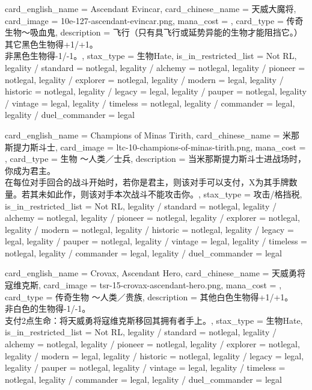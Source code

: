 \documentclass[lang = cn, color = black, 10pt]{AllThatStax}
\begin{document}
\card
{
	card_english_name = {Ascendant Evincar},
	card_chinese_name = {天威大魔将},
	card_image = 10e-127-ascendant-evincar.png,
	mana_cost = ,
	card_type = 传奇生物～吸血鬼,
	description = {飞行（只有具飞行或延势异能的生物才能阻挡它。）\\
		其它黑色生物得+1/+1。\\
		非黑色生物得-1/-1。},
	stax_type = 生物Hate,
	is_in_restricted_list = Not RL,
	legality / standard = notlegal,
	legality / alchemy = notlegal,
	legality / pioneer = notlegal,
	legality / explorer = notlegal,
	legality / modern = legal,
	legality / historic = notlegal,
	legality / legacy = legal,
	legality / pauper = notlegal,
	legality / vintage = legal,
	legality / timeless = notlegal,
	legality / commander = legal,
	legality / duel_commander = legal
}

\card
{
	card_english_name = {Champions of Minas Tirith},
	card_chinese_name = {米那斯提力斯斗士},
	card_image = ltc-10-champions-of-minas-tirith.png,
	mana_cost = ,
	card_type = 生物 ～人类／士兵,
	description = {当米那斯提力斯斗士进战场时，你成为君主。\\
		在每位对手回合的战斗开始时，若你是君主，则该对手可以支付，X为其手牌数量。若其未如此作，则该对手本次战斗不能攻击你。},
	stax_type = 攻击/格挡税,
	is_in_restricted_list = Not RL,
	legality / standard = notlegal,
	legality / alchemy = notlegal,
	legality / pioneer = notlegal,
	legality / explorer = notlegal,
	legality / modern = notlegal,
	legality / historic = notlegal,
	legality / legacy = legal,
	legality / pauper = notlegal,
	legality / vintage = legal,
	legality / timeless = notlegal,
	legality / commander = legal,
	legality / duel_commander = legal
}

\card
{
	card_english_name = {Crovax, Ascendant Hero},
	card_chinese_name = {天威勇将寇维克斯},
	card_image = tsr-15-crovax-ascendant-hero.png,
	mana_cost = ,
	card_type = 传奇生物 ～人类／贵族,
	description = {其他白色生物得+1/+1。\\
		非白色的生物得-1/-1。\\
		支付2点生命：将天威勇将寇维克斯移回其拥有者手上。},
	stax_type = 生物Hate,
	is_in_restricted_list = Not RL,
	legality / standard = notlegal,
	legality / alchemy = notlegal,
	legality / pioneer = notlegal,
	legality / explorer = notlegal,
	legality / modern = legal,
	legality / historic = notlegal,
	legality / legacy = legal,
	legality / pauper = notlegal,
	legality / vintage = legal,
	legality / timeless = notlegal,
	legality / commander = legal,
	legality / duel_commander = legal
}
\end{document}
